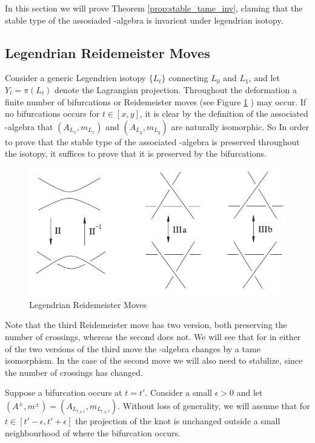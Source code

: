 

In this section we will prove Theorem \ref{prop:stable_tame_inv}, claming that the stable
type of the assosiaded \Ainf-algebra is invarient under legendrian isotopy.

\subsection{Legendrian Reidemeister Moves}
Consider a generic Legendrien isotopy $\{L_t\}$ connecting $L_0$ and $L_1$, and
let $Y_t = \pi(L_t)$ denote the Lagrangian projection. Throughout the
deformation a finite number of bifurcations or Reidemeister moves (see Figure
\ref{fig:reid_moves} ) may occur. 
If no bifurcations occurs for $t\in[x,y]$, it is clear by the definition of the
associated \Ainf-algebra that $(A_{L_x},m_{L_x})$ and $(A_{L_y}, m_{L_y})$ are
naturally isomorphic. So In order to prove that the stable type of the
associated \Ainf-algebra is preserved throughout the isotopy, it suffices to
prove that it is preserved by the bifurcations.

\begin{figure}[h!]
\centering
\includegraphics[width=.6\textwidth]{figs/reid_moves.pdf}
\caption{Legendrian Reidemeister Moves}
\label{fig:reid_moves}
\end{figure}

Note that the third Reidemeister move has two version, both preserving the number
of crossings, whereas the second does not. 
We will see that for in either of the two versions of the third move the \Ainf-algebra changes by a tame isomorphism. 
In the case of the second move we will also need to stabilize, since
the number of crossings has changed.

\newcommand{\Ypm}{Y_{t'\pm\epsilon}}
\newcommand{\Yp}{Y_{t'\pm\epsilon}}
\newcommand{\Ym}{Y_{t'\pm\epsilon}}

Suppose a bifurcation occurs at $t = t'$. Consider a small $\epsilon > 0$ and let
$(A^\pm, m^\pm) = (A_{L_{t\pm\epsilon}}, m_{L_{t\pm\epsilon}})$. 
Without loss of generality, we will assume that for $t\in[t'-\epsilon, t'+\epsilon]$ the projection of the knot is unchanged
outside a small neighbourhood of where the bifurcation occurs. 


